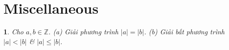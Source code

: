 \documentclass{article}
\newtheorem{baitoan}{}
\begin{document}

\section{Miscellaneous}

\begin{baitoan}
	Cho $a,b\in\mathbb{Z}$. (a) Giải phương trình $|a| = |b|$. (b) Giải bất phương trình $|a| < |b|$ \& $|a|\le|b|$.
\end{baitoan}


\printbibliography[heading=bibintoc]
\end{document}
